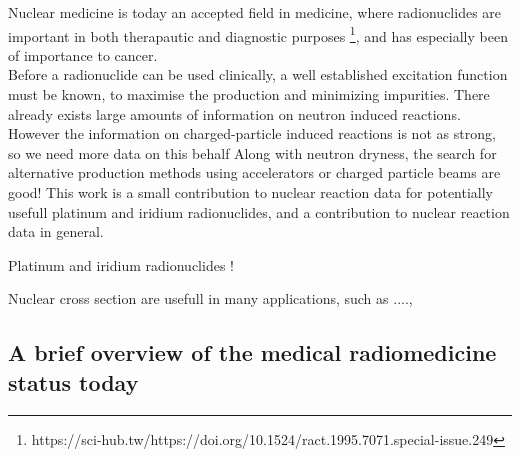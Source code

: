 

Nuclear medicine is today an accepted field in medicine, where radionuclides are important in both therapautic and diagnostic purposes \footnote{https://sci-hub.tw/https://doi.org/10.1524/ract.1995.7071.special-issue.249}, and has especially  been of importance to cancer. \\ 

Before a radionuclide can be used clinically, a well established excitation function must be known, to maximise the production and minimizing impurities. There already exists large amounts of information on neutron induced reactions. However the information on charged-particle induced reactions is not as strong, so we need more data on this behalf  Along with neutron dryness, the search for alternative production methods using accelerators or charged particle beams are good! 
This work is a small contribution to nuclear reaction data for potentially usefull platinum and iridium radionuclides, and a contribution to nuclear reaction data in general. 

Platinum and iridium radionuclides ! 

Nuclear cross section are usefull in many applications, such as ...., 


\subsection{A brief overview of the medical radiomedicine status today }







